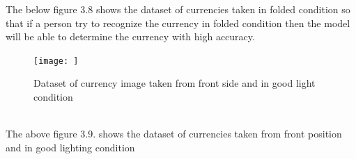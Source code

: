 The below figure 3.8 shows the dataset of currencies taken in folded condition so that if a person try to recognize the currency in folded condition then the model will be able to determine the currency with high accuracy.\\\newpage
\begin{figure}[h!]
	\centering
	\texttt{[image: ]}
	\caption{Dataset of currency image taken from front side and in good light condition}
\end{figure}
\\
\noindent The above figure 3.9. shows the dataset of currencies taken from front position and in good lighting condition\\\newpage

